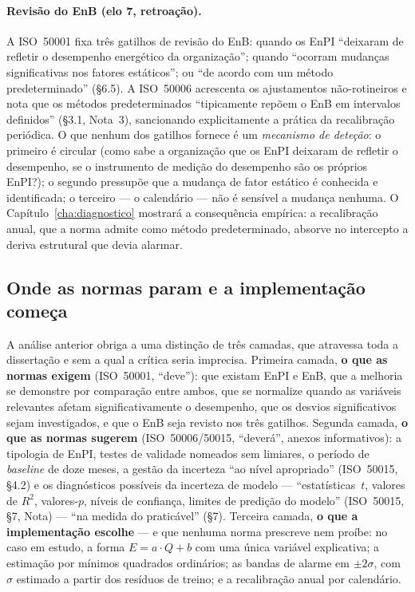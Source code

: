 \paragraph{Revisão do EnB (elo 7, retroação).} A ISO~50001 fixa três gatilhos de revisão do EnB: quando os EnPI \enquote{deixaram de refletir o desempenho energético da organização}; quando \enquote{ocorram mudanças significativas nos fatores estáticos}; ou \enquote{de acordo com um método predeterminado} (\S6.5). A ISO~50006 acrescenta os ajustamentos não-rotineiros e nota que os métodos predeterminados \enquote{tipicamente repõem o EnB em intervalos definidos} (\S3.1, Nota~3), sancionando explicitamente a prática da recalibração periódica. O que nenhum dos gatilhos fornece é um \emph{mecanismo de deteção}: o primeiro é circular (como sabe a organização que os EnPI deixaram de refletir o desempenho, se o instrumento de medição do desempenho são os próprios EnPI?); o segundo pressupõe que a mudança de fator estático é conhecida e identificada; o terceiro --- o calendário --- não é sensível a mudança nenhuma. O Capítulo~\ref{cha:diagnostico} mostrará a consequência empírica: a recalibração anual, que a norma admite como método predeterminado, absorve no intercepto a deriva estrutural que devia alarmar.

\subsection{Onde as normas param e a implementação começa}
\label{sec:enb-camadas}

A análise anterior obriga a uma distinção de três camadas, que atravessa toda a dissertação e sem a qual a crítica seria imprecisa. Primeira camada, \textbf{o que as normas exigem} (ISO~50001, \enquote{deve}): que existam EnPI e EnB, que a melhoria se demonstre por comparação entre ambos, que se normalize quando as variáveis relevantes afetam significativamente o desempenho, que os desvios significativos sejam investigados, e que o EnB seja revisto nos três gatilhos. Segunda camada, \textbf{o que as normas sugerem} (ISO~50006/50015, \enquote{deverá}, anexos informativos): a tipologia de EnPI, testes de validade nomeados sem limiares, o período de \emph{baseline} de doze meses, a gestão da incerteza \enquote{ao nível apropriado} (ISO~50015, \S4.2) e os diagnósticos possíveis da incerteza de modelo --- \enquote{estatísticas~$t$, valores de $R^2$, valores-$p$, níveis de confiança, limites de predição do modelo} (ISO~50015, \S7, Nota) --- \enquote{na medida do praticável} (\S7). Terceira camada, \textbf{o que a implementação escolhe} --- e que nenhuma norma prescreve nem proíbe: no caso em estudo, a forma $E = a \cdot Q + b$ com uma única variável explicativa; a estimação por mínimos quadrados ordinários; as bandas de alarme em $\pm 2\sigma$, com $\sigma$ estimado a partir dos resíduos de treino; e a recalibração anual por calendário.

